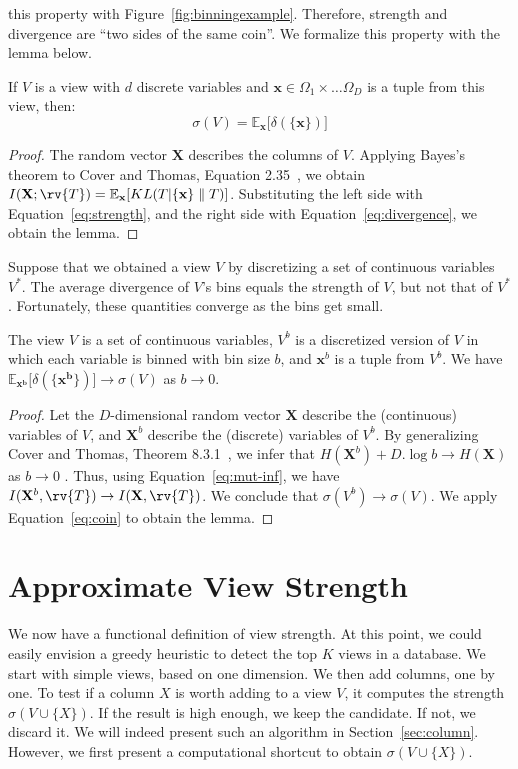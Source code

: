 this property with Figure~\ref{fig:binningexample}.  Therefore, strength and
divergence are ``two sides of the same coin''. We formalize this property with
the lemma below.
\begin{lemma}
    If $V$ is a view with $d$ discrete variables and $\mathbf{x} \in \Omega_1
    \times \ldots \Omega_D$ is a tuple from this view, then:
    \begin{equation}\label{eq:coin}
        \sigma(V) = \mathbb{E}_{\mathbf{x}}  \big[ \delta(\{\mathbf{x}\}) \big]
    \end{equation}
\end{lemma}
\begin{proof}
    The random vector $\mathbf{X}$ describes the columns of $V$. Applying
    Bayes's theorem to Cover and Thomas, Equation
    2.35~\cite{cover2012elements}, we obtain $ I(\mathbf{X} ; \rv{T})
    =\mathbb{E}_{\mathbf{x}}[ KL( T | \{\mathbf{x}\} \parallel T )]$.
    Substituting the left side with Equation~\ref{eq:strength}, and the right
    side with Equation~\ref{eq:divergence}, we obtain the lemma.
\end{proof}
Suppose that we obtained a view $V$ by discretizing a set of continuous
variables $V^*$. The average divergence of $V$'s bins equals the strength of $V$,
but not that of $V^*$. Fortunately, these quantities converge as the bins get
small.
\begin{lemma}
    The view $V$ is a set of continuous variables, $V^b$ is a discretized
    version of $V$ in which each variable is binned with bin size $b$, and
    $\mathbf{x}^b$ is a tuple from $V^b$. We have $\mathbb{E}_{\mathbf{x^b}}
    \big[ \delta(\{\mathbf{x^b}\}) \big] \to  \sigma(V)$ as $b \to 0$.
\end{lemma}
\begin{proof}
    Let the $D$-dimensional random vector $\mathbf{X}$ describe the
    (continuous) variables of $V$, and $\mathbf{X}^b$ describe the (discrete)
    variables of $V^b$. By generalizing Cover and Thomas, Theorem
    8.3.1~\cite{cover2012elements}, we infer that $H(\mathbf{X}^b) + D.\log{b}
    \to H(\mathbf{X})$ as $b \to 0$ .  Thus, using Equation~\ref{eq:mut-inf},
    we have $I(\mathbf{X}^b, \rv{T}) \to I(\mathbf{X}, \rv{T})$. We conclude
    that $\sigma(V^b) \to \sigma(V)$. We apply Equation~\ref{eq:coin} to obtain
    the lemma.
\end{proof}


\section{Approximate View Strength}
\label{sec:approximate}
We now have a functional definition of view strength.  At this point, we could
easily envision a greedy heuristic to detect the top $K$ views in a database.
We start with simple views, based on one dimension. We then add columns, one by
one.  To test if a column $X$ is worth adding to a view $V$, it computes the
strength $\sigma(V \cup \{X\})$. If the result is high enough, we keep the
candidate. If not, we discard it. We will indeed present such an algorithm in
Section~\ref{sec:column}. However, we first present a computational shortcut to
obtain $\sigma(V \cup \{X\})$.

